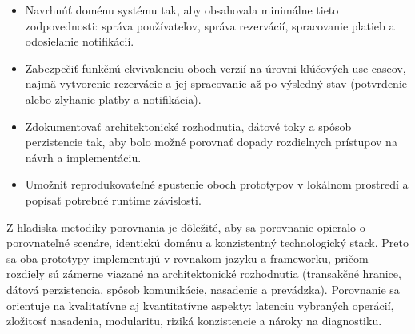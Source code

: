 \begin{itemize}
    \item Navrhnúť doménu systému tak, aby obsahovala minimálne tieto zodpovednosti: správa používateľov, správa rezervácií, spracovanie platieb a odosielanie notifikácií.
    \item Zabezpečiť funkčnú ekvivalenciu oboch verzií na úrovni kľúčových use-caseov, najmä vytvorenie rezervácie a jej spracovanie až po výsledný stav (potvrdenie alebo zlyhanie platby a notifikácia).
    \item Zdokumentovať architektonické rozhodnutia, dátové toky a spôsob perzistencie tak, aby bolo možné porovnať dopady rozdielnych prístupov na návrh a implementáciu.
    \item Umožniť reprodukovateľné spustenie oboch prototypov v lokálnom prostredí a popísať potrebné runtime závislosti.
\end{itemize}

Z hľadiska metodiky porovnania je dôležité, aby sa porovnanie opieralo o porovnateľné scenáre, identickú doménu a konzistentný technologický stack. Preto sa oba prototypy implementujú v rovnakom jazyku a frameworku, pričom rozdiely sú zámerne viazané na architektonické rozhodnutia (transakčné hranice, dátová perzistencia, spôsob komunikácie, nasadenie a prevádzka). Porovnanie sa orientuje na kvalitatívne aj kvantitatívne aspekty: latenciu vybraných operácií, zložitosť nasadenia, modularitu, riziká konzistencie a nároky na diagnostiku.

